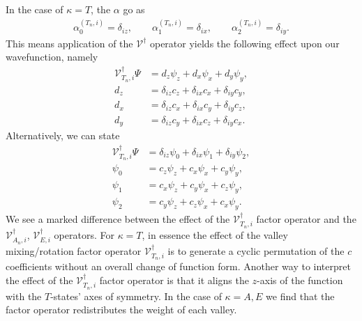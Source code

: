 In the case of $\kappa = T$, the $\alpha$ go as
\begin{gather}
  \alpha_{0}^{\left(T_{n},i\right)} = \delta_{iz}, \quad\quad
  \alpha_{1}^{\left(T_{n},i\right)} = \delta_{ix}, \quad\quad
  \alpha_{2}^{\left(T_{n},i\right)} = \delta_{iy}.
\end{gather}
This means application of the $\mathcal{V}^{\dagger}$ operator yields the
following effect upon our wavefunction, namely
\begin{align}
  \mathcal{V}_{T_{n},i}^{\dagger}
  \Psi
  & =
  d_{z}\psi_{z}
  +
  d_{x}\psi_{x}
  +
  d_{y}\psi_{y}
  ,
\label{wf_symm:b}
\\
  d_{z}
  & =
  \delta_{iz}c_{z}
  +
  \delta_{ix}c_{x}
  +
  \delta_{iy}c_{y}
  ,
\\
  d_{x}
  & =
  \delta_{iz}c_{x}
  +
  \delta_{ix}c_{y}
  +
  \delta_{iy}c_{z}
  ,
\\
  d_{y}
  & =
  \delta_{iz}c_{y}
  +
  \delta_{ix}c_{z}
  +
  \delta_{iy}c_{x}
  .
\end{align}
Alternatively, we can state
\begin{align}
  \mathcal{V}_{T_{n},i}^{\dagger}
  \Psi
  & =
  \delta_{iz}\psi_{0}
  +
  \delta_{ix}\psi_{1}
  +
  \delta_{iy}
  \psi_{2}
  ,
\label{wf_symm2}
\\
  \psi_{0} & = c_{z}\psi_{z}+c_{x}\psi_{x}+c_{y}\psi_{y},
\\
  \psi_{1} & = c_{x}\psi_{z}+c_{y}\psi_{x}+c_{z}\psi_{y},
\\
  \psi_{2} & = c_{y}\psi_{z}+c_{z}\psi_{x}+c_{x}\psi_{y}
  .
\end{align}
We see a marked difference between the effect of the
$\mathcal{V}_{T_{n},i}^{\dagger}$ factor operator and the
$\mathcal{V}_{A_{n},i}^{\dagger}$, $\mathcal{V}_{E,i}^{\dagger}$ operators. For
$\kappa = T$, in essence the effect of the valley mixing/rotation factor
operator $\mathcal{V}_{T_{n},i}^{\dagger}$ is to generate a cyclic permutation
of the $c$ coefficients without an overall change of function form. Another way
to interpret the effect of the $\mathcal{V}_{T_{n},i}^{\dagger}$ factor operator
is that it aligns the $z$-axis of the function with the $T$-states' axes of
symmetry. In the case of $\kappa = A,E$ we find that the factor operator
redistributes the weight of each valley.

